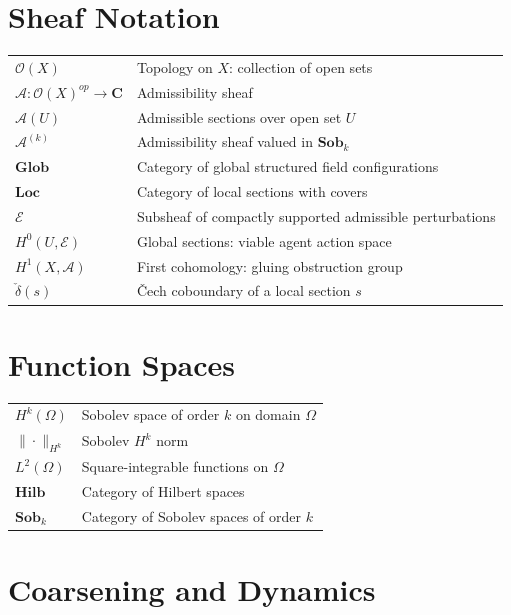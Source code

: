 \section*{Sheaf Notation}

\begin{tabular}{@{}lp{9cm}}
$\mathcal{O}(X)$ & Topology on $X$: collection of open sets \\
$\mathcal{A} : \mathcal{O}(X)^{op} \to \mathbf{C}$ & Admissibility sheaf \\
$\mathcal{A}(U)$ & Admissible sections over open set $U$ \\
$\mathcal{A}^{(k)}$ & Admissibility sheaf valued in $\mathbf{Sob}_k$ \\
$\mathbf{Glob}$ & Category of global structured field configurations \\
$\mathbf{Loc}$ & Category of local sections with covers \\
$\mathcal{E}$ & Subsheaf of compactly supported admissible perturbations \\
$H^0(U, \mathcal{E})$ & Global sections: viable agent action space \\
$H^1(X, \mathcal{A})$ & First cohomology: gluing obstruction group \\
$\check{\delta}(s)$ & \v{C}ech coboundary of a local section $s$ \\
\end{tabular}

\section*{Function Spaces}

\begin{tabular}{@{}lp{9cm}}
$H^k(\Omega)$ & Sobolev space of order $k$ on domain $\Omega$ \\
$\|\cdot\|_{H^k}$ & Sobolev $H^k$ norm \\
$L^2(\Omega)$ & Square-integrable functions on $\Omega$ \\
$\mathbf{Hilb}$ & Category of Hilbert spaces \\
$\mathbf{Sob}_k$ & Category of Sobolev spaces of order $k$ \\
\end{tabular}

\section*{Coarsening and Dynamics}

